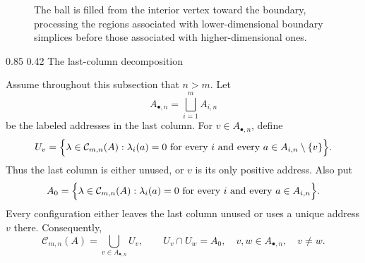 \documentclass[11pt,reqno]{amsart}
\makeatletter
\numberwithin{equation}{section}
\renewcommand\subsection{\@startsection{subsection}{2}{\z@}%
  {0.85\baselineskip \@plus 0.25\baselineskip \@minus 0.10\baselineskip}%
  {0.42\baselineskip}%
  {\normalfont\bfseries}}
\theoremstyle{definition}
\theoremstyle{remark}
\makeatother
\begin{document}
\begin{figure}[htbp]
\centering
{}
\caption{The ball is filled from the interior vertex toward the boundary,
processing the regions associated with lower-dimensional boundary simplices
before those associated with higher-dimensional ones.}
\label{fig:radial-filling}
\end{figure}

\subsection{The last-column decomposition}

Assume throughout this subsection that $n>m$.  Let
\[
 A_{\bullet,n}=\bigsqcup_{i=1}^m A_{i,n}
\]
be the labeled addresses in the last column.  For
$v\in A_{\bullet,n}$, define
\[
 U_v=\Bigl\{\lambda\in\mathcal C_{m,n}(A):
   \lambda_i(a)=0\text{ for every }i\text{ and every }
   a\in A_{i,n}\setminus\{v\}\Bigr\}.
\]
Thus the last column is either unused, or $v$ is its only positive address.
Also put
\[
 A_0=\Bigl\{\lambda\in\mathcal C_{m,n}(A):
   \lambda_i(a)=0\text{ for every }i\text{ and every }a\in A_{i,n}\Bigr\}.
\]
Every configuration either leaves the last column unused or uses a unique
address $v$ there.  Consequently,
\begin{equation}\label{eq:last-column-cover}
 \mathcal C_{m,n}(A)=\bigcup_{v\in A_{\bullet,n}}U_v,
 \qquad U_v\cap U_w=A_0,
 \quad v,w\in A_{\bullet,n},\quad v\ne w.
\end{equation}
\end{document}

